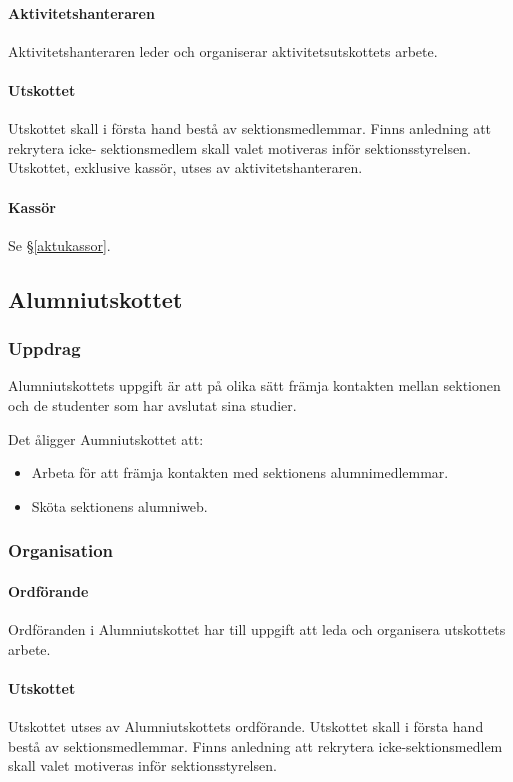 \documentclass{datateknologsektionen-document}
\begin{document}
\paragraph{Aktivitetshanteraren}
Aktivitetshanteraren leder och organiserar aktivitetsutskottets arbete.
\paragraph{Utskottet}

Utskottet skall i första hand bestå av sektionsmedlemmar. Finns anledning att rekrytera icke-
sektionsmedlem skall valet motiveras inför sektionsstyrelsen. Utskottet, exklusive kassör,
utses av aktivitetshanteraren.
\paragraph{Kassör}
Se \S \ref{aktukassor}.
\subsection{Alumniutskottet}
\label{alumni}
\subsubsection{Uppdrag}
Alumniutskottets uppgift är att på olika sätt främja kontakten mellan
sektionen och de studenter som har avslutat sina studier.

Det åligger Aumniutskottet att:
\begin{itemize}
  \item Arbeta för att främja kontakten med sektionens alumnimedlemmar.
  \item Sköta sektionens alumniweb.
\end{itemize}
\subsubsection{Organisation}
\paragraph{Ordförande}
Ordföranden i Alumniutskottet har till uppgift att leda och organisera utskottets arbete.
\paragraph{Utskottet}
Utskottet utses av Alumniutskottets ordförande. Utskottet skall i första hand bestå av
sektionsmedlemmar. Finns anledning att rekrytera icke-sektionsmedlem skall valet
motiveras inför sektionsstyrelsen.
\end{document}
